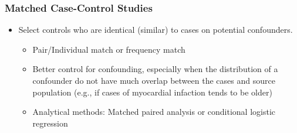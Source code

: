 \documentclass[table,10pt]{beamer}
\begin{document}
\begin{CJK*}{UTF8}{gbsn}
\begin{frame}[t]
\frametitle{Matched Case-Control Studies}
\begin{itemize}
	\item<1-> Select controls who are identical (similar) to cases on potential confounders.
	\begin{itemize}
		\item<2-> \alert{Pair/Individual} match or \alert{frequency} match
		\item<3-> Better control for confounding, especially when the distribution of a 
			confounder do not have much overlap between the cases and source 
			population (e.g., if cases of myocardial infaction tends to be older)
		\item<4-> Analytical methods: \alert{Matched paired analysis} or \alert{conditional 
			logistic regression}
	\end{itemize} 
\end{itemize}
\end{frame}



\end{CJK*}
\end{document}
